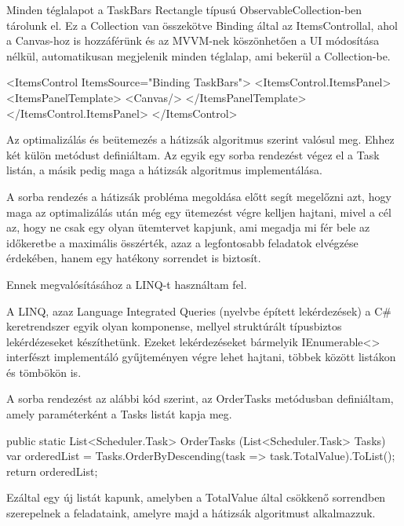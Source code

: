 Minden téglalapot a TaskBars Rectangle típusú ObservableCollection-ben tárolunk el. Ez a Collection van összekötve Binding által az ItemsControllal, ahol a Canvas-hoz is hozzáférünk és az MVVM-nek köszönhetően a UI módosítása nélkül, automatikusan megjelenik minden téglalap, ami bekerül a Collection-be.

\begin{java}
<ItemsControl ItemsSource="{Binding TaskBars}">
<ItemsControl.ItemsPanel>
	<ItemsPanelTemplate>
		<Canvas/>
	</ItemsPanelTemplate>
</ItemsControl.ItemsPanel>
</ItemsControl>
\end{java}



Az optimalizálás és beütemezés a hátizsák algoritmus szerint valósul meg. Ehhez két külön metódust definiáltam. Az egyik egy sorba rendezést végez el a Task listán, a másik pedig maga a hátizsák algoritmus implementálása.


A sorba rendezés a hátizsák probléma megoldása előtt segít megelőzni azt, hogy maga az optimalizálás után még egy ütemezést végre kelljen hajtani, mivel a cél az, hogy ne csak egy olyan ütemtervet kapjunk, ami megadja mi fér bele az időkeretbe a maximális összérték, azaz a legfontosabb feladatok elvégzése érdekében, hanem egy hatékony sorrendet is biztosít.

Ennek megvalósításához a LINQ-t használtam fel.

A LINQ, azaz Language Integrated Queries (nyelvbe épített lekérdezések) a C\# keretrendszer egyik olyan komponense, mellyel struktúrált típusbiztos lekérdézeseket készíthetünk. Ezeket lekérdezéseket bármelyik IEnumerable<> interfészt implementáló gyűjteményen végre lehet hajtani, többek között listákon és tömbökön is.


A sorba rendezést az alábbi kód szerint, az OrderTasks metódusban definiáltam, amely paraméterként a Tasks listát kapja meg.

\begin{java}
public static List<Scheduler.Task> OrderTasks
(List<Scheduler.Task> Tasks)
{
var orderedList =
Tasks.OrderByDescending(task => task.TotalValue).ToList();
return orderedList;
}
\end{java}

Ezáltal egy új listát kapunk, amelyben a TotalValue által csökkenő sorrendben szerepelnek a feladataink, amelyre majd a hátizsák algoritmust alkalmazzuk.

